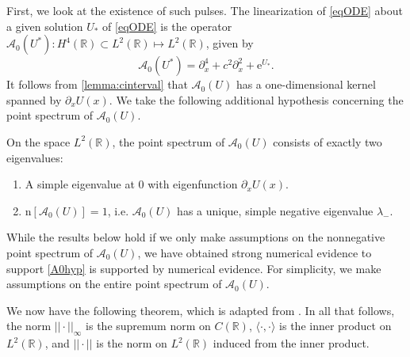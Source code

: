 \documentclass[review,onefignum,onetabnum]{siamart171218}
\newcommand{\R}{\mathbb{R}}
\newcommand{\rme}{\mathrm{e}}
\newcommand{\rmn}{\mathrm{n}}
\newcommand{\calA}{\mathcal{A}}
\begin{document}
First, we look at the existence of such pulses. The linearization of \cref{eqODE} about a given solution $U_*$ of \cref{eqODE} is the operator $\calA_0(U^*): H^4(\R) \subset L^2(\R) \mapsto L^2(\R)$, given by
\begin{equation}\label{defA0}
\calA_0(U^*) = \partial_x^4 + c^2 \partial_x^2 + \rme^{U_*}.
\end{equation}
It follows from \cref{lemma:cinterval} that $\calA_0(U)$ has a one-dimensional kernel spanned by $\partial_x U(x)$. We take the following additional hypothesis concerning the point spectrum of $\calA_0(U)$.

\begin{hypothesis}\label{A0hyp}
On the space $L^2(\R)$, the point spectrum of $\calA_0(U)$ consists of exactly two eigenvalues:
\begin{enumerate}
\item A simple eigenvalue at 0 with eigenfunction $\partial_x U(x)$.
\item $\rmn[\calA_0(U)]=1$, i.e. $\calA_0(U)$ has a unique, simple negative eigenvalue $\lambda_-$.
\end{enumerate}
\end{hypothesis}

\begin{remark}While the results below hold if we only make assumptions on the nonnegative point spectrum of $\calA_0(U)$, we have obtained strong numerical evidence to support \cref{A0hyp} is supported by numerical evidence. For simplicity, we make assumptions on the entire point spectrum of $\calA_0(U)$.
\end{remark}

We now have the following theorem, which is adapted from \cite[Theorem~3.6]{sandstede:iol97}. In all that follows, the norm $||\cdot||_\infty$ is the supremum norm on $C(\R)$, $\langle \cdot, \cdot \rangle$ is the inner product on $L^2(\R)$, and $|| \cdot ||$ is the norm on $L^2(\R)$ induced from the inner product.
\end{document}
